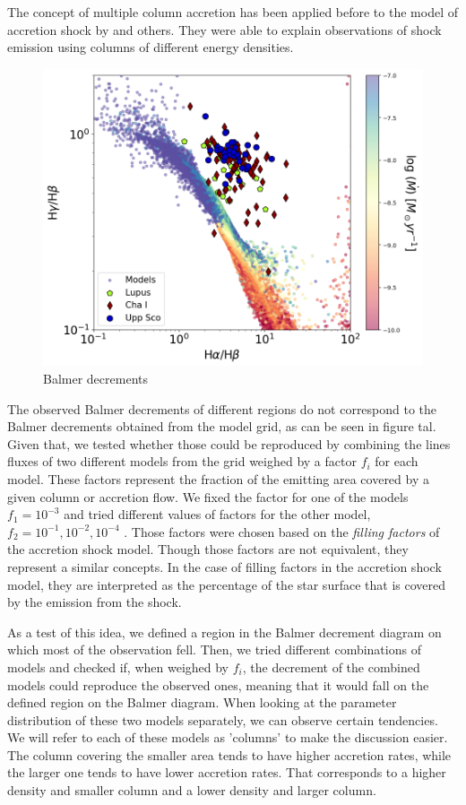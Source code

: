 \documentclass[twocolumn,linenumbers]{aastex631}
\begin{document}
 The concept of multiple column accretion has been applied before to the model of accretion shock by \citet{pittman2022} and others. They were able to explain observations of shock emission using columns of different energy densities. 

\begin{figure}
    \centering
    \includegraphics[width=0.8\linewidth]{figures/BalmerDecrements.png}
    \caption{Balmer decrements}
    \label{fig:balmer_decrement}
\end{figure}

The observed Balmer decrements of different regions do not correspond to the Balmer decrements obtained from the model grid, as can be seen in figure tal. Given that, we tested whether those could be reproduced by combining the lines fluxes of two different models from the grid weighed by a factor $f_i$ for each model. These factors represent the fraction of the emitting area covered by a given column or accretion flow. We fixed the factor for one of the models $f_1=10^{-3}$ and tried different values of factors for the other model, $f_2 = 10^{-1},10^{-2},10^{-4}$ .  Those factors were chosen based on the \textit{filling factors} of the accretion shock model. Though those factors are not equivalent, they represent a similar concepts. In the case of filling factors in the accretion shock model, they are interpreted as the percentage of the star surface that is covered by the emission from the shock.

As a test of this idea, we defined a region in the Balmer decrement diagram on which most of the observation fell. Then, we tried different combinations of models and checked if, when weighed by $f_i$, the decrement of the combined models could reproduce the observed ones, meaning that it would fall on the defined region on the Balmer diagram. When looking at the parameter distribution of these two models separately, we can observe certain tendencies. We will refer to each of these models as 'columns' to make the discussion easier. The column covering the smaller area tends to have higher accretion rates, while the larger one tends to have lower accretion rates. That corresponds to a higher density and smaller column and a lower density and larger column.
\end{document}
